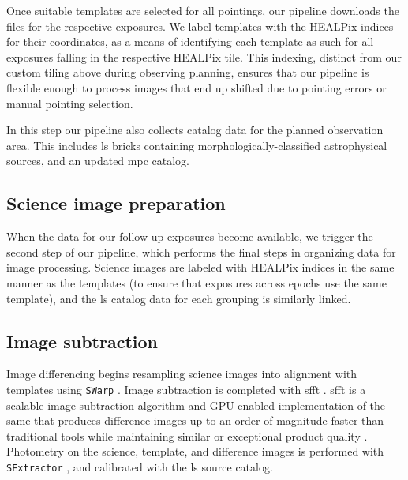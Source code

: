 \documentclass[twocolumn]{aastex631}
\begin{document}
Once suitable templates are selected for all pointings, our pipeline downloads the files for the respective exposures.
We label templates with the HEALPix indices for their coordinates, as a means of identifying each template as such for all exposures falling in the respective HEALPix tile.
This indexing, distinct from our custom tiling above during observing planning, ensures that our pipeline is flexible enough to process images that end up shifted due to pointing errors or manual pointing selection.

In this step our pipeline also collects catalog data for the planned observation area.
This includes \gls{ls} bricks containing morphologically-classified astrophysical sources, and an updated \gls{mpc} catalog.

\subsection{Science image preparation}\label{subsec:sciimgprep}

When the data for our follow-up exposures become available, we trigger the second step of our pipeline, which performs the final steps in organizing data for image processing.
Science images are labeled with HEALPix indices in the same manner as the templates (to ensure that exposures across epochs use the same template), and the \gls{ls} catalog data for each grouping is similarly linked.

\subsection{Image subtraction}\label{subsec:imgsub}

Image differencing begins resampling science images into alignment with templates using \texttt{SWarp} \citep{bertinTERAPIXPipeline2002}.
Image subtraction is completed with \gls{sfft} \citep{huImageSubtractionFourier2022}.
\gls{sfft} is a scalable image subtraction algorithm and GPU-enabled implementation of the same that produces difference images up to an order of magnitude faster than traditional tools while maintaining similar or exceptional product quality \citep{huImageSubtractionFourier2022}. 
Photometry on the science, template, and difference images is performed with \texttt{SExtractor} \citep{SExtractor}, and calibrated with the \gls{ls} source catalog.
\end{document}
